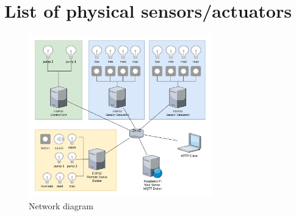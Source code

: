 \documentclass[11pt]{article}
\begin{document}
\newpage
\section{List of physical sensors/actuators}

\begin{figure}[H]
  \includegraphics[width=300px]{../diagrams/network-diagram-WPS.jpg}
  \caption{Network diagram}
  \label{fig:Network1 Diagram}
\end{figure}
\end{document}
